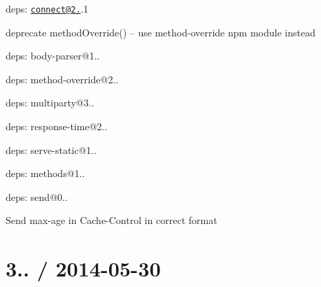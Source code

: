 \begin{DoxyItemize}
\item deps\+: \href{mailto:connect@2.19}{\tt connect@2.}.1
\begin{DoxyItemize}
\item deprecate {\ttfamily method\+Override()} -- use {\ttfamily method-\/override} npm module instead
\item deps\+: body-\/parser@1..
\item deps\+: method-\/override@2..
\item deps\+: multiparty@3..
\item deps\+: response-\/time@2..
\item deps\+: serve-\/static@1..
\end{DoxyItemize}
\item deps\+: methods@1..
\item deps\+: send@0..
\begin{DoxyItemize}
\item Send {\ttfamily max-\/age} in {\ttfamily Cache-\/\+Control} in correct format
\end{DoxyItemize}
\end{DoxyItemize}

\section*{3.. / 2014-\/05-\/30 }


